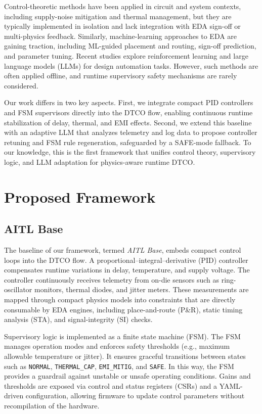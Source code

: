 \documentclass[conference]{IEEEtran}
\begin{document}
Control-theoretic methods have been applied in circuit and system contexts, including supply-noise mitigation and thermal management, but they are typically implemented in isolation and lack integration with EDA sign-off or multi-physics feedback. Similarly, machine-learning approaches to EDA are gaining traction, including ML-guided placement and routing, sign-off prediction, and parameter tuning. Recent studies explore reinforcement learning and large language models (LLMs) for design automation tasks. However, such methods are often applied offline, and runtime supervisory safety mechanisms are rarely considered.

Our work differs in two key aspects. First, we integrate compact PID controllers and FSM supervisors directly into the DTCO flow, enabling continuous runtime stabilization of delay, thermal, and EMI effects. Second, we extend this baseline with an adaptive LLM that analyzes telemetry and log data to propose controller retuning and FSM rule regeneration, safeguarded by a SAFE-mode fallback. To our knowledge, this is the first framework that unifies control theory, supervisory logic, and LLM adaptation for physics-aware runtime DTCO.

\section{Proposed Framework}

\subsection{AITL Base}
The baseline of our framework, termed \emph{AITL Base}, embeds compact control loops into the DTCO flow.  
A proportional--integral--derivative (PID) controller compensates runtime variations in delay, temperature, and supply voltage. The controller continuously receives telemetry from on-die sensors such as ring-oscillator monitors, thermal diodes, and jitter meters. These measurements are mapped through compact physics models into constraints that are directly consumable by EDA engines, including place-and-route (P\&R), static timing analysis (STA), and signal-integrity (SI) checks.

Supervisory logic is implemented as a finite state machine (FSM). The FSM manages operation modes and enforces safety thresholds (e.g., maximum allowable temperature or jitter). It ensures graceful transitions between states such as \texttt{NORMAL}, \texttt{THERMAL\_CAP}, \texttt{EMI\_MITIG}, and \texttt{SAFE}. In this way, the FSM provides a guardrail against unstable or unsafe operating conditions. Gains and thresholds are exposed via control and status registers (CSRs) and a YAML-driven configuration, allowing firmware to update control parameters without recompilation of the hardware.
\end{document}
